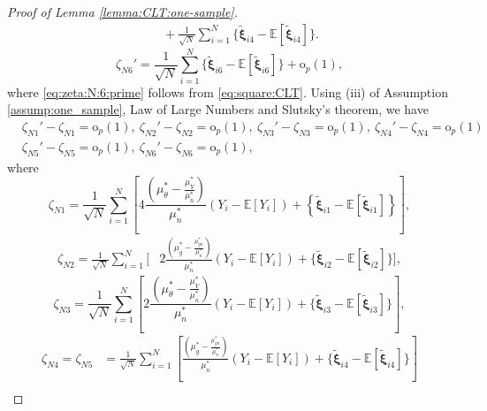 \documentclass[12pt,letterpaper]{article}
\begin{document}
\begin{proof}[Proof of Lemma \ref{lemma:CLT:one-sample}]
$$\begin{array}{rl}
&\displaystyle\quad+\frac{1}{\sqrt{N}}\sum_{i=1}^N\{\tilde{\boldsymbol{\xi}}_{i4}-\mathbb{E}[\tilde{\boldsymbol{\xi}}_{i4}]\}.
\end{array}$$
\begin{equation}\label{eq:zeta:N:6:prime}
\zeta_{N6}'=\frac{1}{\sqrt{N}}\sum_{i=1}^N\{\tilde{\boldsymbol{\xi}}_{i6}-\mathbb{E}[\tilde{\boldsymbol{\xi}}_{i6}]\}+\mathrm{o}_p(1),
\end{equation}
where \eqref{eq:zeta:N:6:prime} follows from \eqref{eq:square:CLT}. Using (iii) of Assumption \ref{assump:one_sample}, Law of Large Numbers and Slutsky's theorem, we have 
\begin{equation}\label{eq:zeta:convergence}
\begin{array}{rcl}
&\zeta_{N1}'-\zeta_{N1}=\mathrm{o}_p(1),\ \zeta_{N2}'-\zeta_{N2}=\mathrm{o}_p(1),\ \zeta_{N3}'-\zeta_{N3}=\mathrm{o}_p(1),\ \zeta_{N4}'-\zeta_{N4}=\mathrm{o}_p(1)&\\
&\zeta_{N5}'-\zeta_{N5}=\mathrm{o}_p(1),\ \zeta_{N6}'-\zeta_{N6}=\mathrm{o}_p(1),&
\end{array}
\end{equation}
where 
\begin{equation}\label{eq:zeta:N:1}
\zeta_{N1}=\frac{1}{\sqrt{N}}\sum_{i=1}^N\left[4\frac{\left(\mu_{\theta}^*-\frac{\mu_Y^*}{\mu_n^*}\right)}{\mu_n^*}(Y_i-\mathbb{E}[Y_i])+\left\{\tilde{\boldsymbol{\xi}}_{i1}-\mathbb{E}[\tilde{\boldsymbol{\xi}}_{i1}]\right\}\right],
\end{equation}
\begin{equation}\label{eq:zeta:N:2}
\begin{array}{rl}
\displaystyle\zeta_{N2}=\frac{1}{\sqrt{N}}\sum_{i=1}^N\Bigg[\!\!\!\!&\displaystyle2\frac{\left(\mu_g^*-\frac{\mu_{gn}^*}{\mu_n^*}\right)}{\mu_n^*}(Y_i-\mathbb{E}[Y_i])+\{\tilde{\boldsymbol{\xi}}_{i2}-\mathbb{E}[\tilde{\boldsymbol{\xi}}_{i2}]\}\Bigg],
\end{array}
\end{equation}
\begin{equation}\label{eq:zeta:N:3}
\zeta_{N3}=\frac{1}{\sqrt{N}}\sum_{i=1}^N\left[2\frac{\left(\mu_{\theta}^*-\frac{\mu_Y^*}{\mu_n^*}\right)}{\mu_n^*}(Y_i-\mathbb{E}[Y_i])+\{\tilde{\boldsymbol{\xi}}_{i3}-\mathbb{E}[\tilde{\boldsymbol{\xi}}_{i3}]\}\right],    
\end{equation}
\begin{equation}\label{eq:zeta:N:4,5}
\begin{array}{rl}
\zeta_{N4}=\zeta_{N5}\!\!\!\!&\displaystyle=\frac{1}{\sqrt{N}}\sum_{i=1}^N\left[\frac{\left(\mu_g^*-\frac{\mu_{gn}^*}{\mu_n^*}\right)}{\mu_n^*}(Y_i-\mathbb{E}[Y_i])+\{\tilde{\boldsymbol{\xi}}_{i4}-\mathbb{E}[\tilde{\boldsymbol{\xi}}_{i4}]\}\right]\\

\end{array}
\end{equation}
\end{proof}
\end{document}
